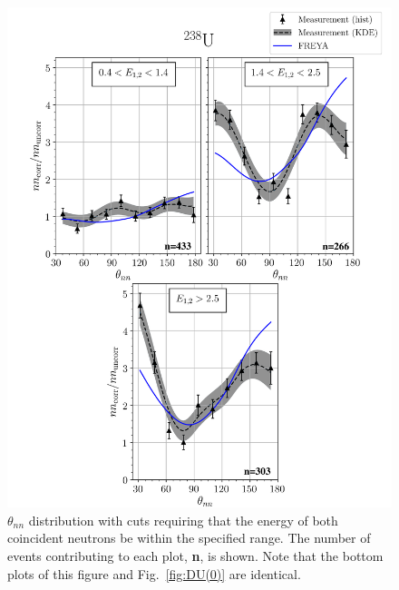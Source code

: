 \begin{figure}
\centering
    \includegraphics[width = \figsize\textwidth]{FinalDUResultw_freya2KDE(fix).png}
    \caption{ $\theta_{nn}$ distribution with cuts requiring that the energy of both coincident neutrons be within the specified range.
    The number of events contributing to each plot, \textbf{n}, is shown. Note that the bottom plots of this figure and Fig.~\ref{fig:DU(0)} are identical.}
    \label{fig:DU(2)}
\end{figure}

